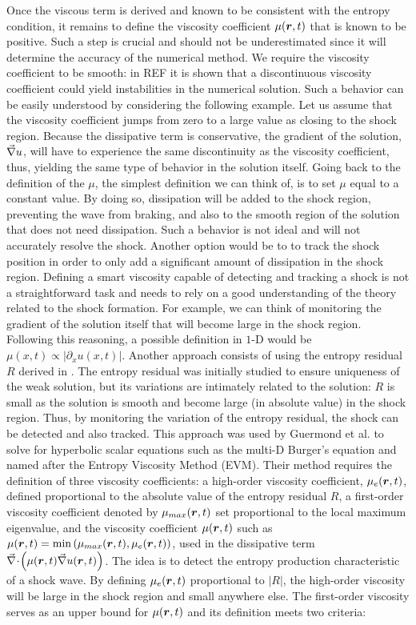 Once the viscous term is derived and known to be consistent with the entropy condition, it remains to define the viscosity coefficient $\mu(\boldsymbol r,t)$ that is known to be positive. Such a step is crucial and should not be underestimated since it will determine the accuracy of the numerical method. We require the viscosity coefficient to be smooth: in REF  it is shown that a discontinuous viscosity coefficient could yield instabilities in the numerical solution. Such a behavior can be easily understood by considering the following example. Let us assume that the viscosity coefficient jumps from zero to a large value as closing to the shock region. Because the dissipative term is conservative, the gradient of the solution, $\vec{\nabla} u$, will have to experience the same discontinuity as the viscosity coefficient, thus, yielding the same type of behavior in the solution itself. Going back to the definition of the $\mu$, the simplest definition we can think of, is to set $\mu$ equal to a constant value. By doing so, dissipation will be added to the shock region, preventing the wave from braking, and also to the smooth region of the solution that does not need dissipation. Such a behavior is not ideal and will not accurately resolve the shock. Another option would be to to track the shock position in order to only add a significant amount of dissipation in the shock region.    
Defining a smart viscosity capable of detecting and tracking a shock is not a straightforward task and needs to rely on a good understanding of the theory related to the shock formation. For example, we can think of monitoring the gradient of the solution itself that will become large in the shock region. Following this reasoning, a possible definition in $1$-D would be $\mu(x,t) \propto \left| \partial_x u(x,t) \right|$. Another approach consists of using the entropy residual $R$ derived in . The entropy residual was initially studied to ensure uniqueness of the weak solution, but its variations are intimately related to the solution: $R$ is small as the solution is smooth and become large (in absolute value) in the shock region. Thus, by monitoring the variation of the entropy residual, the shock can be detected and also tracked. This approach was used by Guermond et al. \cite{jlg1, jlg2, jlg3} to solve for hyperbolic scalar equations such as the multi-D Burger's equation and named after the Entropy Viscosity Method (EVM). Their method requires the definition of three viscosity coefficients: a high-order viscosity coefficient, $\mu_e(\boldsymbol r,t)$, defined proportional to the absolute value of the entropy residual $R$,  a first-order viscosity coefficient denoted by $\mu_{max}(\boldsymbol r,t)$ set proportional to the local maximum eigenvalue, and the viscosity coefficient $\mu(\boldsymbol r,t)$ such as $\mu(\boldsymbol r,t) = \min \left( \mu_{max}(\boldsymbol r,t), \mu_e(\boldsymbol r,t) \right)$, used in the dissipative term $\vec{\nabla}\! \cdot \! \left( \mu(\boldsymbol r,t) \vec{\nabla} u(\boldsymbol r,t) \right)$. The idea is to detect the entropy production characteristic of a shock wave. By defining $\mu_e(\boldsymbol r,t)$ proportional to $\left| R \right|$, the high-order viscosity will be large in the shock region and small anywhere else. The first-order viscosity serves as an upper bound for $\mu(\boldsymbol r,t)$ and its definition meets two criteria:
